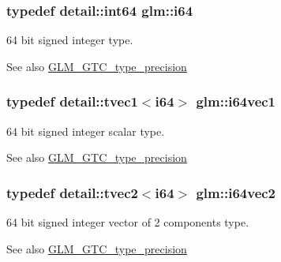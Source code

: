 \subsubsection[{i64}]{\setlength{\rightskip}{0pt plus 5cm}typedef detail\+::int64 {\bf glm\+::i64}}\label{group__gtc__type__precision_gac7a7eaad46064fc952b06df33689da23}
64 bit signed integer type. \begin{DoxySeeAlso}{See also}
\hyperlink{group__gtc__type__precision}{G\+L\+M\+\_\+\+G\+T\+C\+\_\+type\+\_\+precision} 
\end{DoxySeeAlso}
\hypertarget{group__gtc__type__precision_ga1a81383845eb8991d3652848249edeb8}{}
\subsubsection[{i64vec1}]{\setlength{\rightskip}{0pt plus 5cm}typedef detail\+::tvec1$<$i64$>$ {\bf glm\+::i64vec1}}\label{group__gtc__type__precision_ga1a81383845eb8991d3652848249edeb8}
64 bit signed integer scalar type. \begin{DoxySeeAlso}{See also}
\hyperlink{group__gtc__type__precision}{G\+L\+M\+\_\+\+G\+T\+C\+\_\+type\+\_\+precision} 
\end{DoxySeeAlso}
\hypertarget{group__gtc__type__precision_ga8887703a36c5ef093b74abd9e4640c79}{}
\subsubsection[{i64vec2}]{\setlength{\rightskip}{0pt plus 5cm}typedef detail\+::tvec2$<$i64$>$ {\bf glm\+::i64vec2}}\label{group__gtc__type__precision_ga8887703a36c5ef093b74abd9e4640c79}
64 bit signed integer vector of 2 components type. \begin{DoxySeeAlso}{See also}
\hyperlink{group__gtc__type__precision}{G\+L\+M\+\_\+\+G\+T\+C\+\_\+type\+\_\+precision} 
\end{DoxySeeAlso}
\hypertarget{group__gtc__type__precision_gaefca6f789bc2d5150fe594a9aa687840}{}
